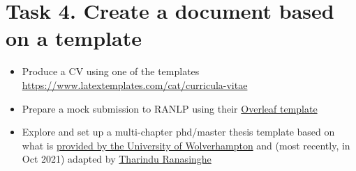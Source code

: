 \documentclass[a4paper,11pt]{article}
\begin{document}
\lstlistoflistings


\section*{Task 4. Create a document based on a template}
\label{task}

\begin{tcolorbox}[width=\textwidth, colback={yellow!40!white}, title={You can complete any of the following tasks for this session. Each involves selecting a template and exploring the commands it uses by modifying it. Acknowledge the original template (add a link to it)in your source code}, colbacktitle=yellow!60!white, coltitle=black]
	\begin{itemize}
		\item Produce a CV using one of the templates \\ \href{here}{https://www.latextemplates.com/cat/curricula-vitae}
		\item Prepare a mock submission to RANLP using their \href{https://www.overleaf.com/latex/templates/instructions-for-ranlp-2021-proceedings/snyphxfdqcpz}{Overleaf template}
		\item Explore and set up a multi-chapter phd/master thesis template based on what is \href{https://github.com/snim2/phdtemplate}{provided by the University of Wolverhampton} and (most recently, in Oct 2021) adapted by \href{https://github.com/TharinduDR/Thesis/}{Tharindu Ranasinghe}
	\end{itemize}
	
\end{tcolorbox}%
\end{document}
